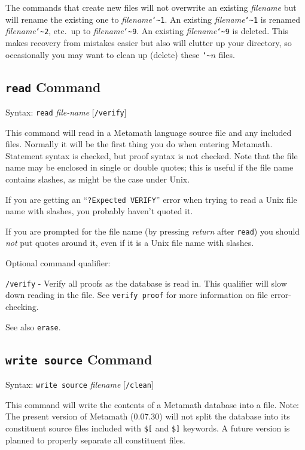 The commands that create new files will not overwrite an existing {\em
filename} but will rename the existing one to {\em
filename}\texttt{{\char`\~}1}.  An existing {\em
filename}\texttt{{\char`\~}1} is renamed {\em
filename}\texttt{{\char`\~}2}, etc.\ up to {\em
filename}\texttt{{\char`\~}9}.  An existing {\em
filename}\texttt{{\char`\~}9} is deleted.  This makes recovery from
mistakes easier but also will clutter up your directory, so occasionally
you may want to clean up (delete) these \texttt{{\char`\~}}$n$ files.


\subsection{\texttt{read} Command}
Syntax:  \texttt{read} {\em file-name} [\texttt{/verify}]

This command will read in a Metamath language source file and any included
files.  Normally it will be the first thing you do when entering Metamath.
Statement syntax is checked, but proof syntax is not checked.
Note that the file name may be enclosed in single or double quotes;
this is useful if the file name contains slashes, as might be the case
under Unix.

If you are getting an ``\texttt{?Expected VERIFY}'' error
when trying to read a Unix file name with slashes, you probably haven't
quoted it.

If you are prompted for the file name (by pressing {\em return}
 after \texttt{read})
you should {\em not} put quotes around it, even if it is a Unix file name
with slashes.

Optional command qualifier:

    \texttt{/verify} - Verify all proofs as the database is read in.  This
         qualifier will slow down reading in the file.  See \texttt{verify
         proof} for more information on file error-checking.

See also \texttt{erase}.



\subsection{\texttt{write source} Command}
Syntax:  \texttt{write source} {\em filename} [\texttt{/clean}]

This command will write the contents of a Metamath
database into a file. Note:  The present version of
Metamath (0.07.30) will not
split the database into its constituent source files included with
\texttt{\$[} and
\texttt{\$]} keywords.  A future version is planned to properly separate
all constituent files.

